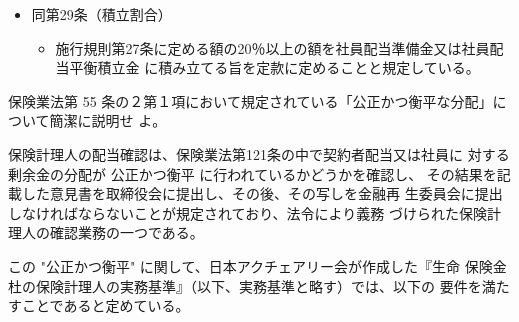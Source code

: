 \documentclass[report,gutter=10mm,fore-edge=10mm,uplatex,dvipdfmx]{jlreq}
\begin{document}
\begin{enumerate} [＊]
\begin{itemize}
\begin{itemize}
\item 社員に対する剰余金の分配をするために積み立てる準備金は、①社員配当準備金、および②
 社員配当平衡積立金とする。
\item 社員配当準備金は、社員に対する剰余金の分配をするための準備金として、貸借対照表上、
 負債の部に計上する。
\item 社員配当準備金の積立限度は次の合計額とする。
\begin{enumerate} [ ]
\item   ①積立配当の額
\item  ②未払配当の額（決算期においては翌朝配当所要額を含む。）
\item  ③全件消滅時配当の額
\item  ④その他①〜③に準ずるものとして保険料及び責任準備金の算出方法書に定める方法によ
  り計算した額
\end{enumerate}
\item 社員配当平衡積立金は、社員に対する剰余金の分配の額を安定させることを目的とする任意
 積立金として、貸借対照表上、資本の部に計上する。
\item 社員配当準備金または社員配当平衡積立金を取崩した場合は、取崩額の合計から社員に対す
 る剰余金の分配に充てた金額を控除した残額を社員配当準備金または社員配当平衡積立金
 に積み立てなければならない。ただし、損失のてん補、基金利息の支払い、損失てん補準備
 金の積立または基金償報積立金の積立に充てる場合を除く。
\end{itemize}
 \item 同第29条（積立割合）
\begin{itemize}
 \item 施行規則第27条に定める額の20％以上の額を社員配当準備金又は社員配当平衡積立金
 に積み立てる旨を定款に定めることと規定している。
\end{itemize}
\end{itemize}
\end{enumerate}

保険業法第 55 条の２第１項において規定されている「公正かつ衡平な分配」について簡潔に説明せ
よ。

保険計理人の配当確認は、保険業法第121条の中で契約者配当又は社員に
対する剰余金の分配が
公正かつ衡平
に行われているかどうかを確認し、
その結果を記載した意見書を取締役会に提出し、その後、その写しを金融再
生委員会に提出しなければならないことが規定されており、法令により義務
づけられた保険計理人の確認業務の一つである。

この "公正かつ衡平"
に関して、日本アクチェアリー会が作成した『生命
保険金杜の保険計理人の実務基準』（以下、実務基準と略す）では、以下の
要件を満たすことであると定めている。
\end{document}
